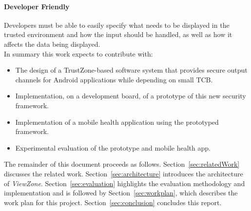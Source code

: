 \paragraph*{\textbf{Developer Friendly\\}} Developers must be able to easily specify what needs to be displayed in the trusted environment and how the input should be handled, as well as how it affects the data being displayed.\\

In summary this work expects to contribute with:
\begin{itemize}
	\item The design of a TrustZone-based software system that provides secure output channels for Android applications while depending on small TCB.	
	\item Implementation, on a development board, of a prototype of this new security framework.
	\item Implementation of a mobile health application using the prototyped framework.
	\item Experimental evaluation of the prototype and mobile health app.
\end{itemize}

%
The remainder of this document proceeds as follows. Section~\ref{sec:relatedWork} discusses the related work. Section~\ref{sec:architecture} introduces the architecture of \emph{ViewZone}. Section~\ref{sec:evaluation} highlights the evaluation methodology and implementation and is followed by Section~\ref{sec:workplan}, which describes the work plan for this project. Section~\ref{sec:conclusion} concludes this report.